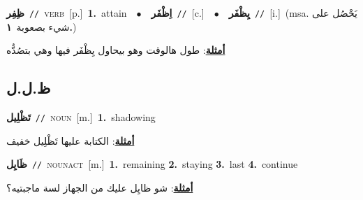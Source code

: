 \documentclass[10pt,a4paper,twoside]{article} %
\begin{document}
\begin{multicols}{2}
{\setlength\topsep{0pt}\textbf{\foreignlanguage{arabic}{ظِفِر}}\ {\color{gray}\texttt{//}\color{black}}\ \textsc{verb}\ [p.]\ \textbf{1.}~attain\ \ $\bullet$\ \ \setlength\topsep{0pt}\textbf{\foreignlanguage{arabic}{اِظْفَر}}\ {\color{gray}\texttt{//}\color{black}}\ [c.]\ \ $\bullet$\ \ \setlength\topsep{0pt}\textbf{\foreignlanguage{arabic}{يِظْفَر}}\ {\color{gray}\texttt{//}\color{black}}\ [i.]\ \color{gray}(msa. \foreignlanguage{arabic}{يَحْصُل على شيء بصعوبة}~\foreignlanguage{arabic}{\textbf{١.}})\color{black}\  \begin{flushright}\color{gray}\foreignlanguage{arabic}{\textbf{\underline{\foreignlanguage{arabic}{أمثلة}}}: طول هالوقت وهو بيحاول يِظْفَر فيها وهي بتصُدُّه}\end{flushright}\color{black}} \vspace{2mm}

\vspace{-3mm}
\subsection*{\color{blue}\foreignlanguage{arabic}{ظ.ل.ل}\color{blue}{}} 

{\setlength\topsep{0pt}\textbf{\foreignlanguage{arabic}{تَظْلِيل}}\ {\color{gray}\texttt{//}\color{black}}\ \textsc{noun}\ [m.]\ \textbf{1.}~shadowing\  \begin{flushright}\color{gray}\foreignlanguage{arabic}{\textbf{\underline{\foreignlanguage{arabic}{أمثلة}}}: الكتابة عليها تَظْلِيل خفيف}\end{flushright}\color{black}} \vspace{2mm}

{\setlength\topsep{0pt}\textbf{\foreignlanguage{arabic}{ظَايِل}}\ {\color{gray}\texttt{//}\color{black}}\ \textsc{noun\textunderscore act}\ [m.]\ \textbf{1.}~remaining  \textbf{2.}~staying  \textbf{3.}~last  \textbf{4.}~continue\  \begin{flushright}\color{gray}\foreignlanguage{arabic}{\textbf{\underline{\foreignlanguage{arabic}{أمثلة}}}: شو ظايِل عليك من الجهاز لسة ماجبتيه؟}\end{flushright}\color{black}} \vspace{2mm}


\end{multicols}
\end{document}
